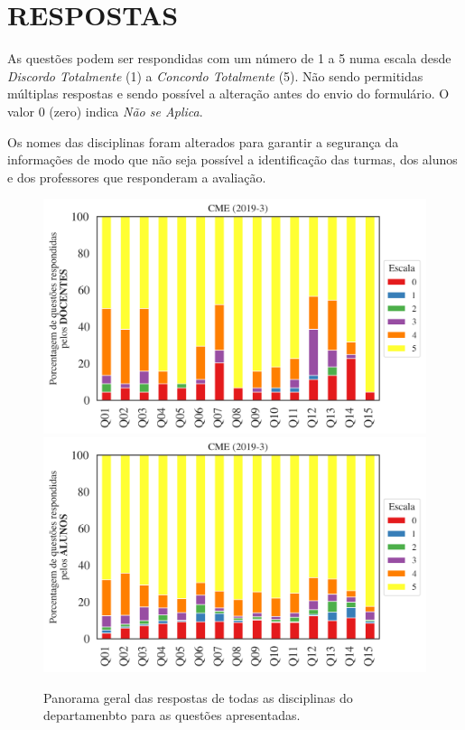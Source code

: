 \documentclass[a4paper,10pt]{article}
\begin{document}
\section{RESPOSTAS}
As questões podem ser respondidas com um número de 1 a 5 numa escala desde {\it Discordo Totalmente} (1) a {\it Concordo Totalmente} (5). Não sendo permitidas múltiplas respostas e sendo possível a alteração antes do envio do formulário. O valor 0 (zero) indica {\it Não se Aplica}.

Os nomes das disciplinas foram alterados para garantir a segurança da informações de modo que não seja possível a identificação das turmas, dos alunos  e dos professores que responderam a avaliação.

\begin{figure}[h]
\centering
\includegraphics[width=0.85\linewidth]{analise_geral_departamento_CME_docentes.png}
\includegraphics[width=0.85\linewidth]{analise_geral_departamento_CME_alunos.png}
\caption{\label{fig:analise_geral_departamento}            Panorama geral das respostas de todas as  disciplinas do departamenbto para as questões apresentadas.}
\end{figure}
\end{document}
